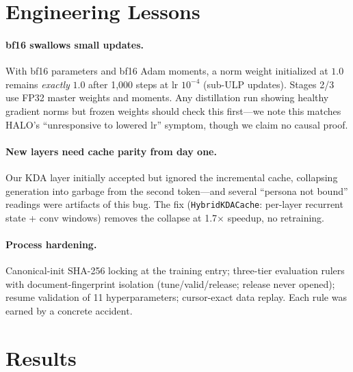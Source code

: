 \documentclass[11pt]{article}
\begin{document}
\section{Engineering Lessons}
\label{sec:lessons}

\paragraph{bf16 swallows small updates.}
With bf16 parameters and bf16 Adam moments, a norm weight initialized at
$1.0$ remains \emph{exactly} $1.0$ after 1{,}000 steps at lr $10^{-4}$
(sub-ULP updates). Stages 2/3 use FP32 master weights and moments. Any
distillation run showing healthy gradient norms but frozen weights
should check this first---we note this matches HALO's
``unresponsive to lowered lr'' symptom, though we claim no causal proof.

\paragraph{New layers need cache parity from day one.}
Our KDA layer initially accepted but ignored the incremental cache,
collapsing generation into garbage from the second token---and several
``persona not bound'' readings were artifacts of this bug. The fix
(\texttt{HybridKDACache}: per-layer recurrent state + conv windows)
removes the collapse at 1.7$\times$ speedup, no retraining.

\paragraph{Process hardening.}
Canonical-init SHA-256 locking at the training entry; three-tier
evaluation rulers with document-fingerprint isolation (tune/valid/release;
release never opened); resume validation of 11 hyperparameters;
cursor-exact data replay. Each rule was earned by a concrete accident.

\section{Results}
\label{sec:results}
\end{document}
